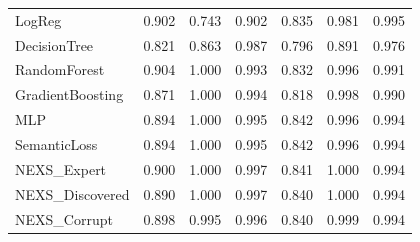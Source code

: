 \begin{table}[t]
\begin{tabular}{lcccccc}
LogReg & 0.902 & 0.743 & 0.902 & 0.835 & 0.981 & 0.995 \\
DecisionTree & 0.821 & 0.863 & 0.987 & 0.796 & 0.891 & 0.976 \\
RandomForest & 0.904 & 1.000 & 0.993 & 0.832 & 0.996 & 0.991 \\
GradientBoosting & 0.871 & 1.000 & 0.994 & 0.818 & 0.998 & 0.990 \\
MLP & 0.894 & 1.000 & 0.995 & 0.842 & 0.996 & 0.994 \\
SemanticLoss & 0.894 & 1.000 & 0.995 & 0.842 & 0.996 & 0.994 \\
NEXS\_Expert & 0.900 & 1.000 & 0.997 & 0.841 & 1.000 & 0.994 \\
NEXS\_Discovered & 0.890 & 1.000 & 0.997 & 0.840 & 1.000 & 0.994 \\
NEXS\_Corrupt & 0.898 & 0.995 & 0.996 & 0.840 & 0.999 & 0.994 \\
\bottomrule
\end{tabular}
\end{table}